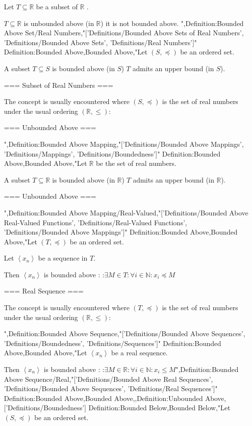 Let $T \subseteq \mathbb R$ be a subset of $\mathbb R$ .


$T \subseteq \mathbb R$ is unbounded above (in $\mathbb R$)  it is not bounded above.
",Definition:Bounded Above Set/Real Numbers,"['Definitions/Bounded Above Sets of Real Numbers', 'Definitions/Bounded Above Sets', 'Definitions/Real Numbers']"
Definition:Bounded Above,Bounded Above,"Let $\left( S, \preceq \right)$ be an ordered set.


A subset $T \subseteq S$ is bounded above (in $S$)  $T$ admits an upper bound (in $S$).


=== Subset of Real Numbers ===

The concept is usually encountered where $\left( S, \preceq \right)$ is the set of real numbers under the usual ordering $\left( \mathbb R, \le \right)$:



=== Unbounded Above ===

",Definition:Bounded Above Mapping,"['Definitions/Bounded Above Mappings', 'Definitions/Mappings', 'Definitions/Boundedness']"
Definition:Bounded Above,Bounded Above,"Let $\mathbb R$ be the set of real numbers.

A subset $T \subseteq \mathbb R$ is bounded above (in $\mathbb R$)  $T$ admits an upper bound (in $\mathbb R$).


=== Unbounded Above ===

",Definition:Bounded Above Mapping/Real-Valued,"['Definitions/Bounded Above Real-Valued Functions', 'Definitions/Real-Valued Functions', 'Definitions/Bounded Above Mappings']"
Definition:Bounded Above,Bounded Above,"Let $\left( T, \preceq \right)$ be an ordered set.

Let $\left\langle x_n \right\rangle$ be a sequence in $T$.


Then $\left\langle x_n \right\rangle$ is bounded above :
:$\exists M \in T: \forall i \in \mathbb N: x_i \preceq M$


=== Real Sequence ===

The concept is usually encountered where $\left( T, \preceq \right)$ is the set of real numbers under the usual ordering $\left( \mathbb R, \le \right)$:

",Definition:Bounded Above Sequence,"['Definitions/Bounded Above Sequences', 'Definitions/Boundedness', 'Definitions/Sequences']"
Definition:Bounded Above,Bounded Above,"Let $\left\langle x_n \right\rangle$ be a real sequence.


Then $\left\langle x_n \right\rangle$ is bounded above :
:$\exists M \in \mathbb R: \forall i \in \mathbb N: x_i \le M$",Definition:Bounded Above Sequence/Real,"['Definitions/Bounded Above Real Sequences', 'Definitions/Bounded Above Sequences', 'Definitions/Real Sequences']"
Definition:Bounded Above,Bounded Above,,Definition:Unbounded Above,['Definitions/Boundedness']
Definition:Bounded Below,Bounded Below,"Let $\left( S, \preceq \right)$ be an ordered set.


